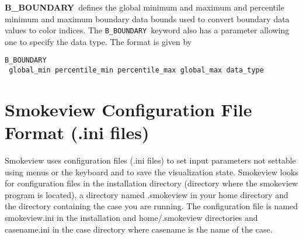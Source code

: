 \documentclass[11pt,twoside]{book}
\begin{document}
{\bf B\_BOUNDARY}\ defines the global minimum and maximum and percentile minimum and
maximum boundary
data bounds used to convert boundary data values to color indices.
The {\tt B\_BOUNDARY}\ keyword also has a parameter allowing
one to specify the data type.  The format is given by
\begin{lstlisting}
B_BOUNDARY
 global_min percentile_min percentile_max global_max data_type
\end{lstlisting}


\section{Smokeview Configuration File Format (.ini files)}
\label{sectionconfig}
\label{appendixini}

Smokeview uses configuration files (.ini files) to set input parameters not
settable using menus or the keyboard and to save the visualization state.
Smokeview looks for configuration files in the installation directory
(directory where the smokeview program is located), a directory named .smokeview
in your home directory and the directory containing the case you are running.
The configuration file is named smokeview.ini in the installation
and  home/.smokeview directories and casename.ini in the case directory where casename is the name of the case.
\end{document}
